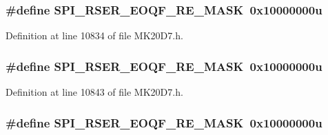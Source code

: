 \subsubsection[{\texorpdfstring{S\+P\+I\+\_\+\+R\+S\+E\+R\+\_\+\+E\+O\+Q\+F\+\_\+\+R\+E\+\_\+\+M\+A\+SK}{SPI_RSER_EOQF_RE_MASK}}]{\setlength{\rightskip}{0pt plus 5cm}\#define S\+P\+I\+\_\+\+R\+S\+E\+R\+\_\+\+E\+O\+Q\+F\+\_\+\+R\+E\+\_\+\+M\+A\+SK~0x10000000u}\hypertarget{group___s_p_i___register___masks_ga41b148811704b6e9903262dbd1d72433}{}\label{group___s_p_i___register___masks_ga41b148811704b6e9903262dbd1d72433}


Definition at line 10834 of file M\+K20\+D7.\+h.

\subsubsection[{\texorpdfstring{S\+P\+I\+\_\+\+R\+S\+E\+R\+\_\+\+E\+O\+Q\+F\+\_\+\+R\+E\+\_\+\+M\+A\+SK}{SPI_RSER_EOQF_RE_MASK}}]{\setlength{\rightskip}{0pt plus 5cm}\#define S\+P\+I\+\_\+\+R\+S\+E\+R\+\_\+\+E\+O\+Q\+F\+\_\+\+R\+E\+\_\+\+M\+A\+SK~0x10000000u}\hypertarget{group___s_p_i___register___masks_ga41b148811704b6e9903262dbd1d72433}{}\label{group___s_p_i___register___masks_ga41b148811704b6e9903262dbd1d72433}


Definition at line 10843 of file M\+K20\+D7.\+h.

\subsubsection[{\texorpdfstring{S\+P\+I\+\_\+\+R\+S\+E\+R\+\_\+\+E\+O\+Q\+F\+\_\+\+R\+E\+\_\+\+M\+A\+SK}{SPI_RSER_EOQF_RE_MASK}}]{\setlength{\rightskip}{0pt plus 5cm}\#define S\+P\+I\+\_\+\+R\+S\+E\+R\+\_\+\+E\+O\+Q\+F\+\_\+\+R\+E\+\_\+\+M\+A\+SK~0x10000000u}\hypertarget{group___s_p_i___register___masks_ga41b148811704b6e9903262dbd1d72433}{}\label{group___s_p_i___register___masks_ga41b148811704b6e9903262dbd1d72433}


